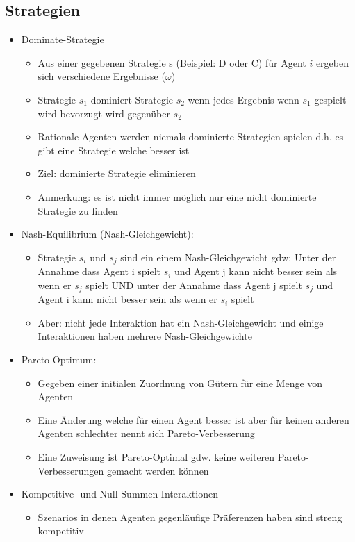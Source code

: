 \documentclass{article} %
\begin{document}
	\subsection{Strategien}
	\begin{itemize}
		\item Dominate-Strategie
		\begin{itemize}
			\item Aus einer gegebenen Strategie s (Beispiel: D oder C) für Agent $i$ ergeben sich verschiedene Ergebnisse ($\omega$)
			\item Strategie $s_{1}$ dominiert Strategie $s_{2}$ wenn jedes Ergebnis wenn $s_{1}$ gespielt wird bevorzugt wird gegenüber $s_{2}$
			\item Rationale Agenten werden niemals dominierte Strategien spielen d.h. es gibt eine Strategie welche besser ist
			\item Ziel: dominierte Strategie eliminieren
			\item Anmerkung: es ist nicht immer möglich nur eine nicht dominierte Strategie zu finden
		\end{itemize}
		\item Nash-Equilibrium (Nash-Gleichgewicht):
		\begin{itemize}
			\item Strategie $s_i$ und $s_j$ sind ein einem Nash-Gleichgewicht gdw: Unter der Annahme dass Agent i spielt $s_i$ und Agent j kann nicht besser sein als wenn er $s_j$ spielt UND unter der Annahme dass Agent j spielt $s_j$ und Agent i kann nicht besser sein als wenn er $s_i$ spielt
			\item Aber: nicht jede Interaktion hat ein Nash-Gleichgewicht und einige Interaktionen haben mehrere Nash-Gleichgewichte
		\end{itemize}
		\item Pareto Optimum:
		\begin{itemize}
			\item Gegeben einer initialen Zuordnung von Gütern für eine Menge von Agenten
			\item Eine Änderung welche für einen Agent besser ist aber für keinen anderen Agenten schlechter nennt sich Pareto-Verbesserung
			\item Eine Zuweisung ist Pareto-Optimal gdw. keine weiteren Pareto-Verbesserungen gemacht werden können
		\end{itemize}
		\item Kompetitive- und Null-Summen-Interaktionen
		\begin{itemize}
			\item Szenarios in denen Agenten gegenläufige Präferenzen haben sind streng kompetitiv

\end{itemize}
\end{itemize}
\end{document}
